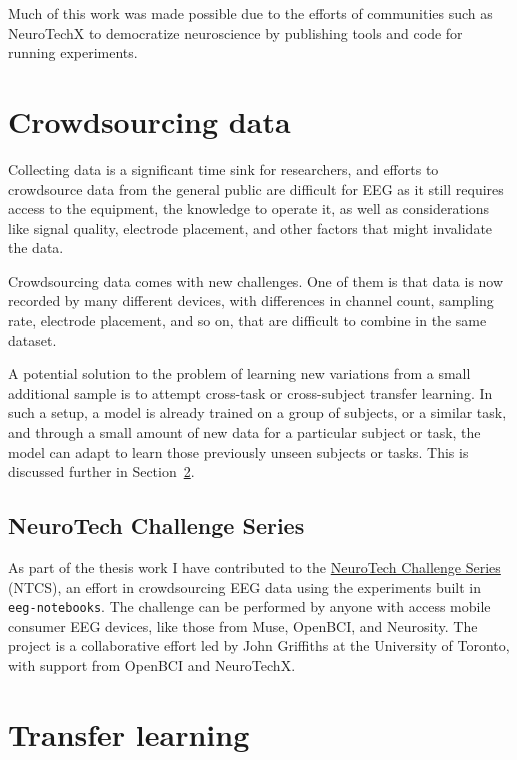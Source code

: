     Much of this work was made possible due to the efforts of communities such as NeuroTechX to democratize neuroscience by publishing tools and code for running experiments.

\section{Crowdsourcing data}

    Collecting data is a significant time sink for researchers, and efforts to crowdsource data from the general public are difficult for EEG as it still requires access to the equipment, the knowledge to operate it, as well as considerations like signal quality, electrode placement, and other factors that might invalidate the data.

    Crowdsourcing data comes with new challenges. One of them is that data is now recorded by many different devices, with differences in channel count, sampling rate, electrode placement, and so on, that are difficult to combine in the same dataset. 

    A potential solution to the problem of learning new variations from a small additional sample is to attempt cross-task or cross-subject transfer learning. In such a setup, a model is already trained on a group of subjects, or a similar task, and through a small amount of new data for a particular subject or task, the model can adapt to learn those previously unseen subjects or tasks. This is discussed further in Section~\ref{section:transfer-learning}.

    \subsection{NeuroTech Challenge Series}\label{section:ntcs}

    As part of the thesis work I have contributed to the \href{https://neurotech-challenge.com/}{NeuroTech Challenge Series} (NTCS), an effort in crowdsourcing EEG data using the experiments built in \texttt{eeg-notebooks}. The challenge can be performed by anyone with access mobile consumer EEG devices, like those from Muse, OpenBCI, and Neurosity\@. The project is a collaborative effort led by John Griffiths at the University of Toronto, with support from OpenBCI and NeuroTechX.


\section{Transfer learning}\label{section:transfer-learning}

